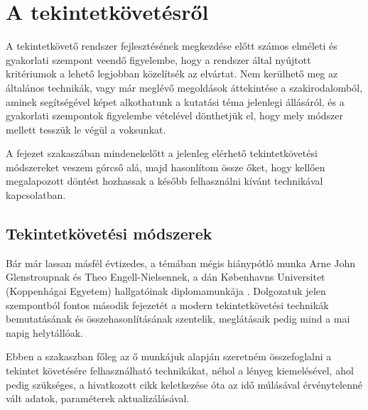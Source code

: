 \chapter{A tekintetkövetésről}\label{sect:tekintetkovetes}

A tekintetkövető rendszer fejlesztésének megkezdése előtt számos elméleti és gyakorlati szempont veendő figyelembe, hogy a rendszer által nyújtott kritériumok a lehető legjobban közelítsék az elvártat. Nem kerülhető meg az általános technikák, vagy már meglévő megoldások áttekintése a szakirodalomból, aminek segítségével képet alkothatunk a kutatási téma jelenlegi állásáról, és a gyakorlati szempontok figyelembe vételével dönthetjük el, hogy mely módszer mellett tesszük le végül a voksunkat.

\bigskip

A fejezet  szakaszában mindenekelőtt a jelenleg elérhető tekintetkövetési módszereket veszem górcső alá, majd hasonlítom össze őket, hogy kellően megalapozott döntést hozhassak a később felhasználni kívánt technikával kapcsolatban. 

\section{Tekintetkövetési módszerek}\label{sect:modszerek}

Bár már lassan másfél évtizedes, a témában mégis hiánypótló munka Arne John Glenstroupnak és Theo Engell-Nielsennek, a dán Københavns Universitet (Koppenhágai Egyetem) hallgatóinak diplomamunkája \cite{eye_media}. Dolgozatuk jelen szempontból fontos második fejezetét a modern tekintetkövetési technikák bemutatásának és összehasonlításának szentelik, meglátásaik pedig mind a mai napig helytállóak.

\bigskip

Ebben a szakaszban főleg az ő munkájuk alapján szeretném összefoglalni a tekintet követésére felhasználható technikákat, néhol a lényeg kiemelésével, ahol pedig szükséges, a hivatkozott cikk keletkezése óta az idő múlásával érvénytelenné vált adatok, paraméterek aktualizálásával.

